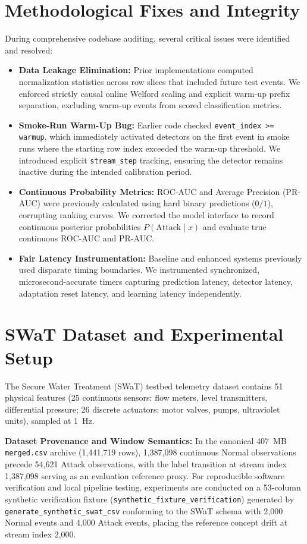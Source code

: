\documentclass[conference]{IEEEtran}
\begin{document}
\section{Methodological Fixes and Integrity}
During comprehensive codebase auditing, several critical issues were identified and resolved:
\begin{itemize}
    \item \textbf{Data Leakage Elimination:} Prior implementations computed normalization statistics across row slices that included future test events. We enforced strictly causal online Welford scaling and explicit warm-up prefix separation, excluding warm-up events from scored classification metrics.
    \item \textbf{Smoke-Run Warm-Up Bug:} Earlier code checked \texttt{event\_index >= warmup}, which immediately activated detectors on the first event in smoke runs where the starting row index exceeded the warm-up threshold. We introduced explicit \texttt{stream\_step} tracking, ensuring the detector remains inactive during the intended calibration period.
    \item \textbf{Continuous Probability Metrics:} ROC-AUC and Average Precision (PR-AUC) were previously calculated using hard binary predictions ($0/1$), corrupting ranking curves. We corrected the model interface to record continuous posterior probabilities $P(\text{Attack} \mid x)$ and evaluate true continuous ROC-AUC and PR-AUC.
    \item \textbf{Fair Latency Instrumentation:} Baseline and enhanced systems previously used disparate timing boundaries. We instrumented synchronized, microsecond-accurate timers capturing prediction latency, detector latency, adaptation reset latency, and learning latency independently.
\end{itemize}

\section{SWaT Dataset and Experimental Setup}
The Secure Water Treatment (SWaT) testbed telemetry dataset contains 51 physical features (25 continuous sensors: flow meters, level transmitters, differential pressure; 26 discrete actuators: motor valves, pumps, ultraviolet units), sampled at 1~Hz.

\textbf{Dataset Provenance and Window Semantics:} In the canonical 407~MB \texttt{merged.csv} archive (1,441,719 rows), 1,387,098 continuous Normal observations precede 54,621 Attack observations, with the label transition at stream index 1,387,098 serving as an evaluation reference proxy. For reproducible software verification and local pipeline testing, experiments are conducted on a 53-column synthetic verification fixture (\texttt{synthetic\_fixture\_verification}) generated by \texttt{generate\_synthetic\_swat\_csv} conforming to the SWaT schema with 2,000 Normal events and 4,000 Attack events, placing the reference concept drift at stream index 2,000.
\end{document}
